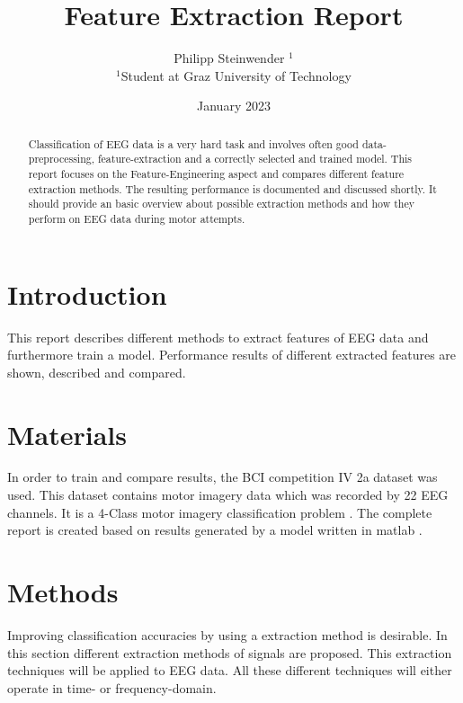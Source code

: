 \documentclass{article}
\title{Feature Extraction Report}
\author{Philipp Steinwender $^{1}$ \\
    \small $^{1}$Student at Graz University of Technology
}
\date{January 2023}
\begin{document}
\maketitle

\begin{abstract}
Classification of EEG data is a very hard task and involves often good data-preprocessing, feature-extraction and a correctly selected and trained model. This report focuses on the Feature-Engineering aspect and compares different feature extraction methods. The resulting performance is documented and discussed shortly. It should provide an basic overview about possible extraction methods and how they perform on EEG data during motor attempts.
\end{abstract} \hspace{10pt}
\newpage
\tableofcontents
\newpage

\section{Introduction}
This report describes different methods to extract features of EEG data and furthermore train a model. Performance results of different extracted features are shown, described and compared.
\section{Materials}
In order to train and compare results, the BCI competition IV 2a dataset was used. This dataset contains motor imagery data which was recorded by 22 EEG channels. It is a 4-Class motor imagery classification problem \parencite{10.3389/fnins.2012.00055, brunner2008bci}.
The complete report is created based on results generated by a model written in matlab \parencite{Steinwender_Research_Software_2022}.

\section{Methods}
Improving classification accuracies by using a extraction method is desirable. In this section different extraction methods of signals are proposed. This extraction techniques will be applied to EEG data. All these different techniques will either operate in time- or frequency-domain.
\end{document}
